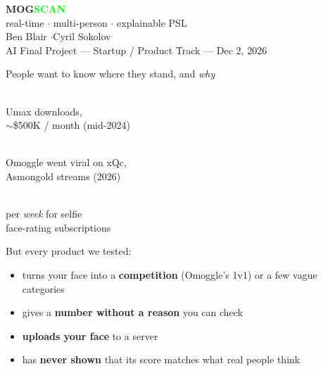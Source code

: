 \documentclass[aspectratio=169,11pt]{beamer}
\newcommand{\stat}[2]{\begin{minipage}[t]{0.3\textwidth}\centering{\fontsize{26}{30}\selectfont\bfseries\textcolor{lime}{#1}}\\[1mm]\small\textcolor{muted}{#2}\end{minipage}}
\begin{document}
\begin{frame}[plain]
\vfill
\centering
{\fontsize{54}{60}\selectfont\bfseries MOG\textcolor{lime}{SCAN}}\\[4mm]
{\Large real-time $\cdot$ multi-person $\cdot$ explainable PSL}\\[10mm]
\textcolor{muted}{Ben Blair \quad$\cdot$\quad Cyril Sokolov}\\[1mm]
\textcolor{muted}{\small AI Final Project --- Startup / Product Track --- Dec 2, 2026}
\vfill
\end{frame}

\begin{frame}{People want to know where they stand, and \emph{why}}
\vspace{2mm}
\begin{center}
\stat{7M+}{Umax downloads,\\ $\sim$\$500K / month (mid-2024)}\hfill
\stat{Twitch}{Omoggle went viral on xQc,\\ Asmongold streams (2026)}\hfill
\stat{\$4--10}{per \emph{week} for selfie\\ face-rating subscriptions}
\end{center}
\vspace{6mm}
But every product we tested:
\begin{itemize}
  \item turns your face into a \textbf{competition} (Omoggle's 1v1) or a few vague categories
  \item gives a \textbf{number without a reason} you can check
  \item \textbf{uploads your face} to a server
  \item has \textbf{never shown} that its score matches what real people think
\end{itemize}
\end{frame}
\end{document}
